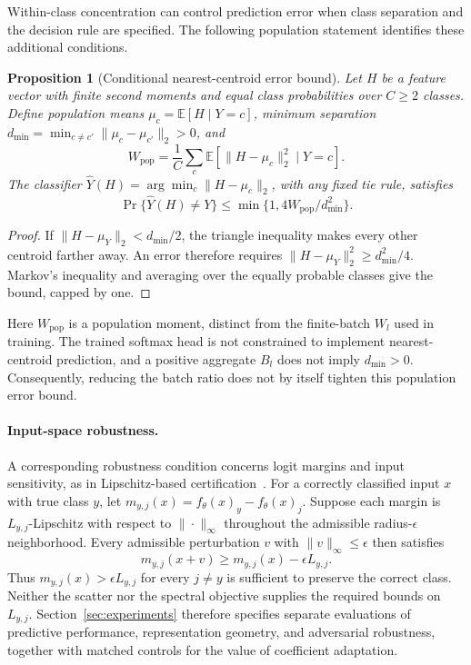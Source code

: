 \documentclass[10pt,a4paper,twocolumn]{article}
\newtheorem{proposition}{Proposition}
\newcommand{\E}{\mathbb{E}}
\begin{document}
Within-class concentration can control prediction error when
class separation and the decision rule are specified. The following
population statement identifies these additional conditions.

\begin{proposition}[Conditional nearest-centroid error bound]
\label{prop:centroid}
Let $H$ be a feature vector with finite second moments and equal
class probabilities over $C\ge2$ classes. Define population means
$\mu_c=\E[H\mid Y=c]$, minimum separation
$d_{\min}=\min_{c\ne c'}\|\mu_c-\mu_{c'}\|_2>0$, and
\[
 W_{\mathrm{pop}}=\frac1C\sum_c
       \E[\|H-\mu_c\|_2^2\mid Y=c].
\]
The classifier $\widehat Y(H)=\arg\min_c\|H-\mu_c\|_2$,
with any fixed tie rule, satisfies
\begin{equation}
 \Pr\{\widehat Y(H)\ne Y\}
 \le\min\{1,4W_{\mathrm{pop}}/d_{\min}^2\}.
 \label{eq:centroid_error}
\end{equation}
\end{proposition}
\begin{proof}
If $\|H-\mu_Y\|_2<d_{\min}/2$, the triangle inequality
makes every other centroid farther away. An error therefore
requires $\|H-\mu_Y\|_2^2\ge d_{\min}^2/4$.
Markov's inequality and averaging over the equally probable
classes give the bound, capped by one.
\end{proof}

Here $W_{\mathrm{pop}}$ is a population moment, distinct from
the finite-batch $W_l$ used in training. The trained softmax
head is not constrained to implement nearest-centroid prediction,
and a positive aggregate $B_l$ does not imply $d_{\min}>0$.
Consequently, reducing the batch ratio does not by itself tighten
this population error bound.

\paragraph{Input-space robustness.}
A corresponding robustness condition concerns logit margins and
input sensitivity, as in Lipschitz-based
certification~\cite{hein2017formal}. For a correctly classified
input $x$ with true class $y$, let
$m_{y,j}(x)=f_\theta(x)_y-f_\theta(x)_j$.
Suppose each margin is $L_{y,j}$-Lipschitz with respect to
$\|\cdot\|_\infty$ throughout the admissible radius-$\epsilon$
neighborhood. Every admissible perturbation $v$ with
$\|v\|_\infty\le\epsilon$ then satisfies
\[
 m_{y,j}(x+v)\ge m_{y,j}(x)-\epsilon L_{y,j}.
\]
Thus $m_{y,j}(x)>\epsilon L_{y,j}$ for every $j\ne y$
is sufficient to preserve the correct class. Neither the scatter
nor the spectral objective supplies the required bounds on
$L_{y,j}$. Section~\ref{sec:experiments} therefore specifies
separate evaluations of predictive performance, representation
geometry, and adversarial robustness, together with matched
controls for the value of coefficient adaptation.
\end{document}
